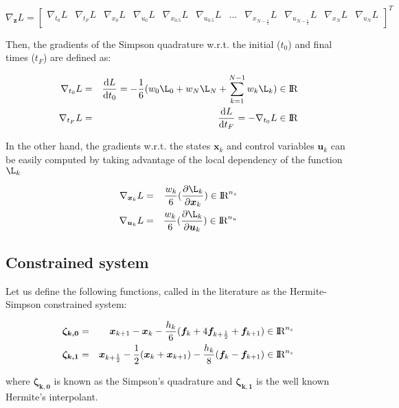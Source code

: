 \documentclass[12pt]{article}
\newcommand{\real}{\mbox{\rm I$\!$R}}
\begin{document}
\begin{equation} \nonumber
    \nabla_{\bm{z}} L =\begin{bmatrix}
\nabla_{t_{0}} L & \nabla_{t_{F}}L & \nabla_{x_{0}} L & \nabla_{u_{0}} L & \nabla_{x_{0.5}} L & \nabla_{u_{0.5}} L & \hdots & \nabla_{x_{N-\frac{1}{2}}} L & \nabla_{u_{N-\frac{1}{2}}} L & \nabla_{x_{N}} L & \nabla_{u_{N}} L
\end{bmatrix}^T
\end{equation}

\noindent Then, the gradients of the Simpson quadrature w.r.t. the initial ($t_0$) and final times ($t_F$) are defined as:

\begin{eqnarray}
   \nabla_{t_{0}}L&=&\frac{\mathrm{d} L}{\mathrm{d} t_0} = -\frac{1}{6}(w_0\L_0+w_{N}\L_{N}+\sum_{k=1}^{N-1} w_k\L_k) \in  \real\\
   \nabla_{t_{F}}L&=&\frac{\mathrm{d} L}{\mathrm{d} t_F} = - \nabla_{t_{0}} L \in \real
   \end{eqnarray}
   
\noindent In the other hand, the gradients w.r.t. the states $\bm{x}_k$ and control variables $\bm{u}_k$ can be easily computed by taking advantage of the local dependency of the function $\L_k$

\begin{eqnarray}
   \nabla_{\bm{x}_k}L&=&\frac{w_k}{6}(\frac{\partial \L_k}{\partial \bm{x}_k}) \in  \real ^{n_s}\\
   \nabla_{\bm{u}_k}L&=&\frac{w_k}{6}(\frac{\partial \L_k}{\partial \bm{u}_k}) \in  \real ^{n_u}
\end{eqnarray}

\subsection{Constrained system}
Let us define the following functions, called in the literature as the Hermite-Simpson constrained system:

\begin{eqnarray}
    \bm{\zeta_{k,0}} &=&\bm{x}_{k+1}-\bm{x}_{k}- \frac{h_k}{6}(\bm{f}_{k}+4\bm{f}_{k+\frac{1}{2}}+\bm{f}_{k+1}) \in \real^{n_s} \label{eq:simpson_quadrature}\\
    \bm{\zeta_{k,1}} &=&\bm{x}_{k+\frac{1}{2}}-\frac{1}{2}(\bm{x}_{k}+\bm{x}_{k+1})- \frac{h_k}{8}(\bm{f}_{k}-\bm{f}_{k+1}) \in \real^{n_s} \label{eq:hermite_interpolant}
\end{eqnarray}

\noindent where $\bm{\zeta_{k,0}}$ is known as the Simpson's quadrature and $\bm{\zeta_{k,1}}$ is the well known Hermite's interpolant.\\
\end{document}
